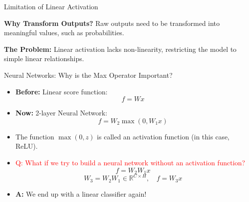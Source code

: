 \documentclass[serif, aspectratio=169]{beamer}
\begin{document}
\begin{frame}{Limitation of Linear Activation}

    \textbf{Why Transform Outputs?} Raw outputs need to be transformed into meaningful values, such as probabilities.

    \textbf{The Problem:} Linear activation lacks non-linearity, restricting the model to simple linear relationships.
\end{frame}
\begin{frame}{Neural Networks: Why is the Max Operator Important?}
  \begin{itemize}
      \item \textbf{Before:} Linear score function:
      \[
      f = Wx
      \]
      \item \textbf{Now:} 2-layer Neural Network:
      \[
      f = W_2 \max(0, W_1 x)
      \]
      \item The function \(\max(0, z)\) is called an activation function (in this case, ReLU).
      \item \textcolor{red}{Q: What if we try to build a neural network without an activation function?}
      \[
      f = W_2 W_1 x
      \]
      \[
      W_3 = W_2 W_1 \in \mathbb{R}^{C \times H}, \quad f = W_3 x
      \]
      \item \textbf{A:} We end up with a linear classifier again!
  \end{itemize}
\end{frame}
\end{document}
